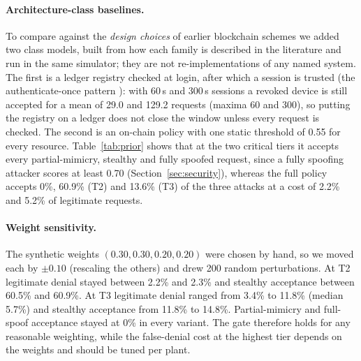 \paragraph{Architecture-class baselines.}\label{sec:prior_eval} To compare against the \emph{design choices} of earlier blockchain schemes we added two class models, built from how each family is described in the literature and run in the same simulator; they are not re-implementations of any named system. The first is a ledger registry checked at login, after which a session is trusted (the authenticate-once pattern \cite{wang2026medicaliot,james2024authz}): with 60\,s and 300\,s sessions a revoked device is still accepted for a mean of 29.0 and 129.2 requests (maxima 60 and 300), so putting the registry on a ledger does not close the window unless every request is checked. The second is an on-chain policy with one static threshold of 0.55 for every resource. Table~\ref{tab:prior} shows that at the two critical tiers it accepts every partial-mimicry, stealthy and fully spoofed request, since a fully spoofing attacker scores at least 0.70 (Section~\ref{sec:security}), whereas the full policy accepts 0\%, 60.9\% (T2) and 13.6\% (T3) of the three attacks at a cost of 2.2\% and 5.2\% of legitimate requests.

\begin{table}[t]
\centering
\caption{Static single-threshold policy versus the full policy at the two critical tiers}
\label{tab:prior}
\scriptsize
\setlength{\tabcolsep}{2.5pt}

\par\smallskip{}
\end{table}

\paragraph{Weight sensitivity.} The synthetic weights $(0.30,0.30,0.20,0.20)$ were chosen by hand, so we moved each by $\pm0.10$ (rescaling the others) and drew 200 random perturbations. At T2 legitimate denial stayed between 2.2\% and 2.3\% and stealthy acceptance between 60.5\% and 60.9\%. At T3 legitimate denial ranged from 3.4\% to 11.8\% (median 5.7\%) and stealthy acceptance from 11.8\% to 14.8\%. Partial-mimicry and full-spoof acceptance stayed at 0\% in every variant. The gate therefore holds for any reasonable weighting, while the false-denial cost at the highest tier depends on the weights and should be tuned per plant.

